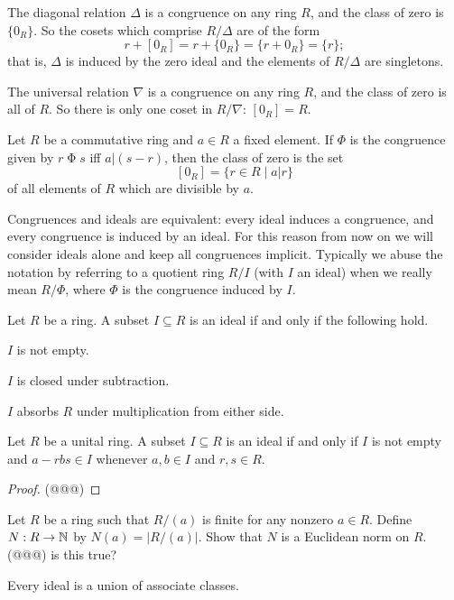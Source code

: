 \begin{examples}
\item The diagonal relation \(\Delta\) is a congruence on any ring \(R\), and the class of zero is \(\{0_R\}\).
So the cosets which comprise \(R/\Delta\) are of the form \[ r+[0_R] = r+\{0_R\} = \{ r+0_R \} = \{r\}; \] that is, \(\Delta\) is induced by the zero ideal and the elements of \(R/\Delta\) are singletons.
\item The universal relation \(\nabla\) is a congruence on any ring \(R\), and the class of zero is all of \(R\).
So there is only one coset in \(R/\nabla\): \([0_R] = R\).
\item Let \(R\) be a commutative ring and \(a \in R\) a fixed element.
If \(\Phi\) is the congruence given by \(r \mathrel{\Phi} s\) iff \(a|(s-r)\), then the class of zero is the set \[ [0_R] = \{ r \in R \mid a|r \} \] of all elements of \(R\) which are divisible by \(a\).
\end{examples}

Congruences and ideals are equivalent: every ideal induces a congruence, and every congruence is induced by an ideal.
For this reason from now on we will consider ideals alone and keep all congruences implicit.
Typically we abuse the notation by referring to a quotient ring \(R/I\) (with \(I\) an ideal) when we really mean \(R/\Phi\), where \(\Phi\) is the congruence induced by \(I\).

\begin{prop}
Let \(R\) be a ring.
A subset \(I \subseteq R\) is an ideal if and only if the following hold.
\begin{proplist*}
\item \(I\) is not empty.
\item \(I\) is closed under subtraction.
\item \(I\) absorbs \(R\) under multiplication from either side.
\end{proplist*}
\end{prop}

\begin{prop}
Let \(R\) be a unital ring.
A subset \(I \subseteq R\) is an ideal if and only if \(I\) is not empty and \(a - rbs \in I\) whenever \(a,b \in I\) and \(r,s \in R\).
\end{prop}

\begin{proof}
(@@@)
\end{proof}



\Exercises%

\begin{exercise}
Let \(R\) be a ring such that \(R/(a)\) is finite for any nonzero \(a \in R\).
Define \(N : R \rightarrow \mathbb{N}\) by \(N(a) = |R/(a)|\).
Show that \(N\) is a Euclidean norm on \(R\).
(@@@) is this true?
\end{exercise}

\begin{exercise}
Every ideal is a union of associate classes.
\end{exercise}
